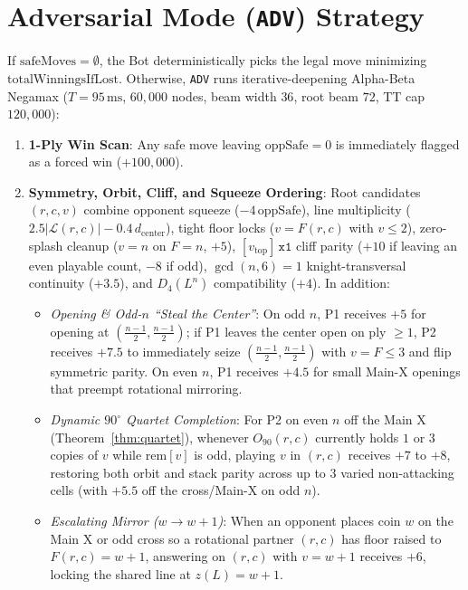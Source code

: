 \documentclass[10pt,a4paper]{article}
\theoremstyle{remark}
\begin{document}
\section{\texorpdfstring{Adversarial Mode (\texttt{ADV}) Strategy}{Adversarial Mode (ADV) Strategy}}

If $\mathrm{safeMoves} = \emptyset$, the Bot deterministically picks the legal move minimizing $\mathrm{totalWinningsIfLost}$. Otherwise, \texttt{ADV} runs iterative-deepening Alpha-Beta Negamax ($T = 95\,\mathrm{ms}$, $60{,}000$ nodes, beam width $36$, root beam $72$, TT cap $120{,}000$):

\begin{enumerate}[nosep]
  \item \textbf{1-Ply Win Scan}: Any safe move leaving $\mathrm{oppSafe} = 0$ is immediately flagged as a forced win ($+100{,}000$).
  \item \textbf{Symmetry, Orbit, Cliff, and Squeeze Ordering}: Root candidates $(r,c,v)$ combine opponent squeeze ($-4\,\mathrm{oppSafe}$), line multiplicity ($2.5|\mathcal{L}(r,c)| - 0.4\,d_{\mathrm{center}}$), tight floor locks ($v = F(r,c)$ with $v \le 2$), zero-splash cleanup ($v = n$ on $F = n$, $+5$), $[v_{\mathrm{top}}]\,\texttt{x1}$ cliff parity ($+10$ if leaving an even playable count, $-8$ if odd), $\gcd(n,6)=1$ knight-transversal continuity ($+3.5$), and $D_4(L^n)$ compatibility ($+4$). In addition:
  \begin{itemize}[nosep]
    \item \emph{Opening \& Odd-$n$ ``Steal the Center''}: On odd $n$, P1 receives $+5$ for opening at $(\frac{n-1}{2},\frac{n-1}{2})$; if P1 leaves the center open on ply $\ge 1$, P2 receives $+7.5$ to immediately seize $(\frac{n-1}{2},\frac{n-1}{2})$ with $v = F \le 3$ and flip symmetric parity. On even $n$, P1 receives $+4.5$ for small Main-X openings that preempt rotational mirroring.
    \item \emph{Dynamic $90^\circ$ Quartet Completion}: For P2 on even $n$ off the Main X (Theorem~\ref{thm:quartet}), whenever $O_{90}(r,c)$ currently holds $1$ or $3$ copies of $v$ while $\mathrm{rem}[v]$ is odd, playing $v$ in $(r,c)$ receives $+7$ to $+8$, restoring both orbit and stack parity across up to $3$ varied non-attacking cells (with $+5.5$ off the cross/Main-X on odd $n$).
    \item \emph{Escalating Mirror ($w \to w+1$)}: When an opponent places coin $w$ on the Main X or odd cross so a rotational partner $(r,c)$ has floor raised to $F(r,c) = w+1$, answering on $(r,c)$ with $v = w+1$ receives $+6$, locking the shared line at $z(L) = w+1$.

\end{itemize}
\end{enumerate}
\end{document}
